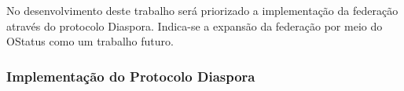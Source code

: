 No desenvolvimento deste trabalho será priorizado a implementação da federação
através do protocolo Diaspora. Indica-se a expansão da federação por meio do OStatus
como um trabalho futuro.

\subsubsection{Implementação do Protocolo Diaspora}



